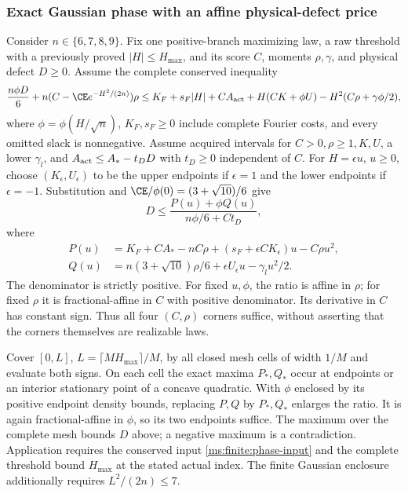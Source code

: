 \subsubsection{Exact Gaussian phase with an affine physical-defect price}
\label{ms:finite:exact-phase}
Consider $n\in\{6,7,8,9\}$. Fix one positive-branch
maximizing law, a raw threshold with a previously proved
$|H|\le H_{\max}$, and its score $C$, moments $\rho,\gamma$, and
physical defect $D\ge0$. Assume the complete conserved inequality
\begin{align}
 \frac{n\phi D}{6}+n(C-\CE e^{-H^2/(2n)})\rho
 \le K_F+s_F|H|+C A_{\rm act}
 +H(CK+\phi U)-H^2(C\rho+\gamma\phi/2),
 \label{ms:finite:phase-input}
\end{align}
where $\phi=\phi(H/\sqrt n)$, $K_F,s_F\ge0$ include complete
Fourier costs, and every omitted slack is nonnegative. Assume acquired
intervals for $C>0,\rho\ge1,K,U$, a lower $\gamma_l$, and
$A_{\rm act}\le A_*-t_DD$ with $t_D\ge0$ independent of $C$.
For $H=\epsilon u$, $u\ge0$, choose $(K_\epsilon,U_\epsilon)$ to
be the upper endpoints if $\epsilon=1$ and the lower endpoints if
$\epsilon=-1$. Substitution and $\CE/\phi(0)=(3+\sqrt{10})/6$ give
\begin{equation}
 D\le\frac{P(u)+\phi Q(u)}{n\phi/6+Ct_D},
 \label{ms:finite:phase-ratio}
\end{equation}
where
\begin{align*}
 P(u)&=K_F+CA_*-nC\rho+(s_F+\epsilon CK_\epsilon)u-C\rho u^2,\\
 Q(u)&=n(3+\sqrt{10})\rho/6+\epsilon U_\epsilon u-\gamma_lu^2/2.
\end{align*}
The denominator is strictly positive. For fixed $u,\phi$, the ratio
is affine in $\rho$; for fixed $\rho$ it is fractional-affine in
$C$ with positive denominator. Its derivative in $C$ has constant
sign. Thus all four $(C,\rho)$ corners suffice, without asserting that
the corners themselves are realizable laws.

Cover $[0,L]$, $L=\lceil MH_{\max}\rceil/M$, by all closed mesh
cells of width $1/M$ and evaluate both signs. On each cell the exact
maxima $P_*,Q_*$ occur at endpoints or an interior stationary point
of a concave quadratic. With $\phi$ enclosed by its positive endpoint
density bounds, replacing $P,Q$ by $P_*,Q_*$ enlarges the ratio.
It is again fractional-affine in $\phi$, so its two endpoints suffice.
The maximum over the complete mesh bounds $D$ above; a negative
maximum is a contradiction. Application requires the conserved input \eqref{ms:finite:phase-input}
and the complete threshold bound $H_{\max}$ at the stated actual index.
The finite Gaussian enclosure additionally requires $L^2/(2n)\le7$.

